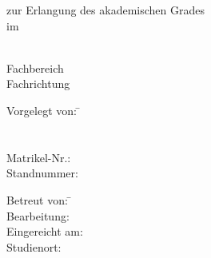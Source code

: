 \begin{titlepage}

\begin{minipage}{\textwidth}
		\noindent \hfill 
\end{minipage}
\vspace{4em}

\begin{center}
    {\huge \art}

    {\Large zur Erlangung des akademischen Grades \akadGrad}\\
    {\Large im \studiengang}

    \vspace{4em}

    \textbf{{\Large \titel}}

    \vspace{4em}

    \hochschule \\
    Fachbereich \fachbereich \\
    Fachrichtung \fachrichtung

    \vspace{8em}

	\begin{multicols}{2}
	\begin{minipage}{\textwidth}
		\begin{tabbing}

		Vorgelegt von:  \hspace*{0.5em}\= \autor \\
		\> \strasseAutor \\
        \> \stadtAutor \\
        Matrikel-Nr.: \> \matrikelnr \\
        Standnummer: \> \standnummer
        \end{tabbing}
    \end{minipage}
        
	\begin{minipage}{\textwidth}
		\begin{tabbing}
		 
        Betreut von: \hspace*{1.5em}\= \betreuer \\
        Bearbeitung: \> \bearbeitungsZeitraum \\
        Eingereicht am: \> \datumAbgabe \\
        Studienort: \> \ort \\
		\end{tabbing}

	\end{minipage}
	\end{multicols}
\end{center}
\end{titlepage}
